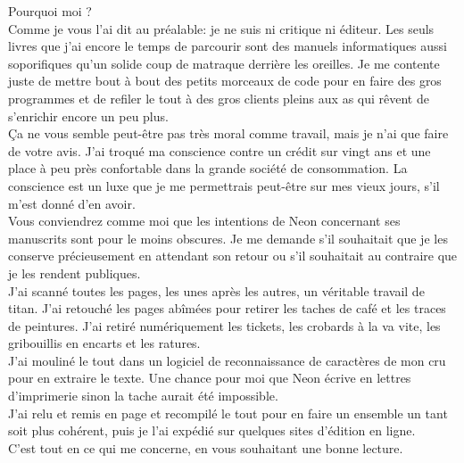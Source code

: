 Pourquoi moi ? \\
Comme je vous l'ai dit au préalable: je ne suis ni critique ni éditeur. Les seuls livres que j'ai encore le temps de parcourir sont des manuels informatiques aussi soporifiques qu'un solide coup de matraque derrière les oreilles. Je me contente juste de mettre bout à bout des petits morceaux de code pour en faire des gros programmes et de refiler le tout à des gros clients pleins aux as qui rêvent de s'enrichir encore un peu plus. \\
Ça ne vous semble peut-être pas très moral comme travail, mais je n'ai que faire de votre avis. J'ai troqué ma conscience contre un crédit sur vingt ans et une place à peu près confortable dans la grande société de consommation. La conscience est un luxe que je me permettrais peut-être sur mes vieux jours, s'il m'est donné d'en avoir. \\

Vous conviendrez comme moi que les intentions de Neon concernant ses manuscrits sont pour le moins obscures. Je me demande s'il souhaitait que je les conserve précieusement en attendant son retour ou s'il souhaitait au contraire que je les rendent publiques. \\

J'ai scanné toutes les pages, les unes après les autres, un véritable travail de titan. J'ai retouché les pages abîmées pour retirer les taches de café et les traces de peintures. J'ai retiré numériquement les tickets, les crobards à la va vite, les gribouillis en encarts et les ratures. \\
J'ai mouliné le tout dans un logiciel de reconnaissance de caractères de mon cru pour en extraire le texte. Une chance pour moi que Neon écrive en lettres d'imprimerie sinon la tache aurait été impossible. \\
J'ai relu et remis en page et recompilé le tout pour en faire un ensemble un tant soit plus cohérent, puis je l'ai expédié sur quelques sites d'édition en ligne. \\

C'est tout en ce qui me concerne, en vous souhaitant une bonne lecture.